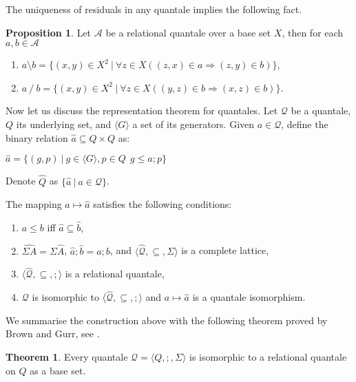 \documentclass[a4paper]{article}
\theoremstyle{definition}
\theoremstyle{theorem}
\newtheorem{theorem}{Theorem}
\theoremstyle{proposition}
\newtheorem{proposition}{Proposition}
\theoremstyle{lemma}
\theoremstyle{ex}
\theoremstyle{corollary}
\theoremstyle{claim}
\begin{document}
The uniqueness of residuals in any quantale implies the following fact.
\begin{proposition}\label{ok}
  Let $\mathcal{A}$ be a relational quantale over a base set $X$, then for each $a, b \in \mathcal{A}$
  \begin{enumerate}
    \item $a \setminus b = \{ (x, y) \in X^2 \: | \: \forall z \in X ( (z, x) \in a \Rightarrow (z, y) \in b) \}$,
    \item $a \: / \: b = \{ (x, y) \in X^2 \: | \: \forall z \in X ( (y, z) \in b \Rightarrow (x, z) \in b )\}$.
  \end{enumerate}
\end{proposition}

Now let us discuss the representation theorem for quantales. Let $\mathcal{Q}$ be a quantale, $Q$ its underlying set, and $\langle G \rangle$ a set of its generators. Given $a \in \mathcal{Q}$, define the binary relation $\hat{a} \subseteq Q \times Q$ as:

\begin{center}
  $\hat{a} = \{ (g,p) \: | \: g \in \langle G \rangle, p \in Q \:\: g \leq a ; p \}$
\end{center}
Denote $\widehat{Q}$ as $\{ \hat{a} \: | \: a \in \mathcal{Q} \}$.

The mapping $a \mapsto \hat{a}$ satisfies the following conditions:

\begin{enumerate}
\item $a \leq b$ iff $\hat{a} \subseteq \hat{b}$,

\item $\widehat{\Sigma A} = \Sigma \widehat{A}$, $\hat{a} ; \hat{b} = \widehat{a ; b}$, and $\langle \widehat{\mathcal{Q}}, \subseteq, \Sigma \rangle$ is a complete lattice,

\item $\langle \widehat{\mathcal{Q}}, \subseteq, ; \rangle$ is a relational quantale,

\item $\mathcal{Q}$ is isomorphic to $\langle \widehat{\mathcal{Q}}, \subseteq, ; \rangle$ and $a \mapsto \hat{a}$ is a quantale isomorphism.
\end{enumerate}

We summarise the construction above with the following theorem proved by Brown and Gurr, see \cite[Theorem 3.11]{brown1993representation}.

\begin{theorem} \label{quantaleRep}
  Every quantale $\mathcal{Q} = \langle Q, ;, \Sigma \rangle$ is isomorphic to a relational quantale on $Q$ as a base set.
\end{theorem}
\end{document}
